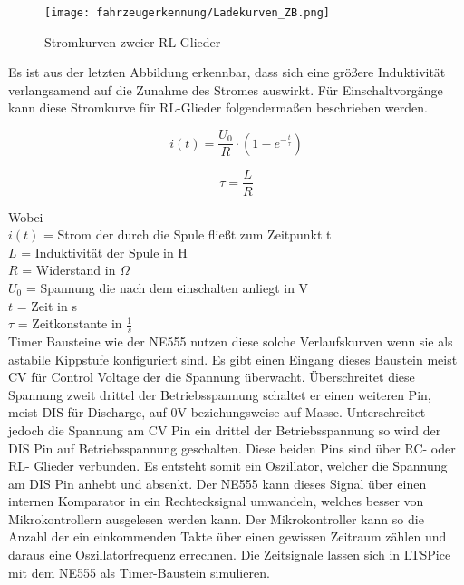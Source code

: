 \begin{figure}[H]
    \centering
    \texttt{[image: fahrzeugerkennung/Ladekurven\_ZB.png]}
    \caption{Stromkurven zweier RL-Glieder}
\end{figure}

Es ist aus der letzten Abbildung erkennbar, dass sich eine größere Induktivität verlangsamend auf die Zunahme des Stromes auswirkt. Für Einschaltvorgänge kann diese Stromkurve
für RL-Glieder folgendermaßen beschrieben werden.

\begin{equation} \label{eq:i_L}
    i(t) = \frac{U_{0}}{R} \cdot (1 - e^{-\frac{t}{\tau}})
\end{equation}

\begin{equation} \label{eq:tau_RL}
    \tau = \frac{L}{R}
\end{equation} 

Wobei \\
$i(t)$ = Strom der durch die Spule fließt zum Zeitpunkt t \\
$L$ = Induktivität der Spule in H\\
$R$ = Widerstand in $\Omega$ \\
$U_0$ = Spannung die nach dem einschalten anliegt in V\\
$t$ = Zeit in s \\
$\tau$ = Zeitkonstante in $\frac{1}{s}$\\

Timer Bausteine wie der NE555 nutzen diese solche Verlaufskurven wenn sie als astabile Kippstufe konfiguriert sind.
Es gibt einen Eingang dieses Baustein meist CV für Control Voltage der die Spannung überwacht. Überschreitet diese Spannung zweit drittel
der Betriebsspannung schaltet er einen weiteren Pin, meist DIS für Discharge, auf 0V beziehungsweise auf Masse. Unterschreitet jedoch 
die Spannung am CV Pin ein drittel der Betriebsspannung so wird der DIS Pin auf Betriebsspannung geschalten. Diese beiden Pins 
sind über RC- oder RL- Glieder verbunden. Es entsteht somit ein Oszillator, welcher die Spannung am DIS Pin anhebt und absenkt.
Der NE555 kann dieses Signal über einen internen Komparator in ein Rechtecksignal umwandeln, welches besser von Mikrokontrollern ausgelesen
werden kann. Der Mikrokontroller kann so die Anzahl der ein einkommenden Takte über einen gewissen Zeitraum zählen und daraus eine Oszillatorfrequenz errechnen.
Die Zeitsignale lassen sich in LTSPice mit dem NE555 als Timer-Baustein simulieren.

